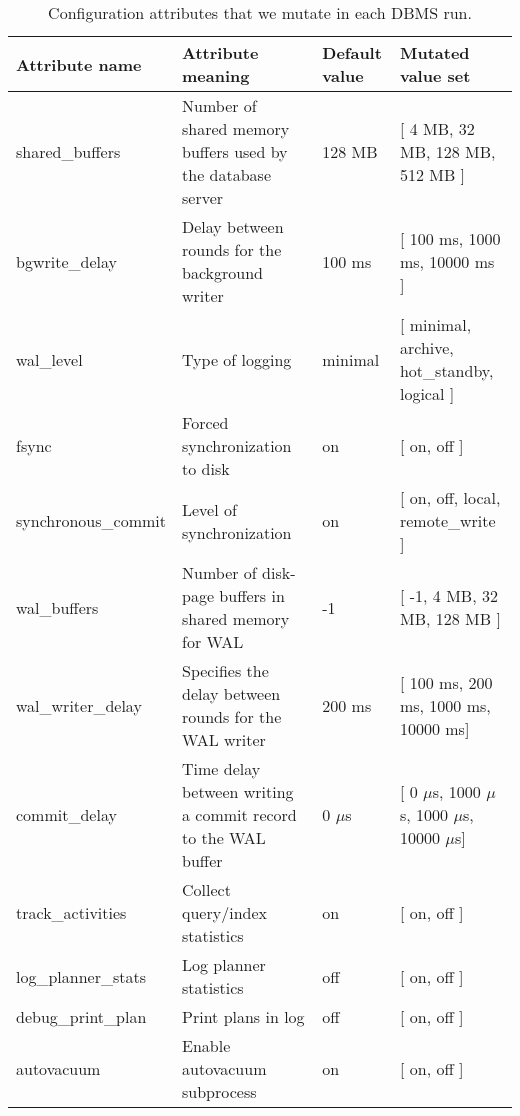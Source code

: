 \begin{table*}
\centering
\small{
  \centering
  \begin{adjustbox}{max width=\textwidth}
  \begin{tabular}{l|lll} 
	\toprule
   		Attribute name &  Attribute meaning & Default value & Mutated value set \\
    \midrule
    	shared\_buffers & Number of shared memory buffers used by the
    	database server & 128 MB &  [ 4 MB, 32 MB, 128 MB, 512 MB ] \\
    	bgwrite\_delay &  Delay between rounds for the
    	background writer & 100 ms &  [ 100 ms, 1000 ms, 10000 ms ] \\
    	wal\_level & Type of logging & minimal &  [ minimal, archive,
    	hot\_standby, logical ] \\
    	fsync & Forced synchronization to disk & on &  [ on, off ] \\
    	synchronous\_commit & Level of synchronization & on &  [ on, off, local,
    	remote\_write ] \\
    	wal\_buffers & Number of disk-page buffers in shared memory for WAL & 
    	-1 &  [ -1, 4 MB, 32 MB, 128 MB ] \\
    	wal\_writer\_delay & Specifies the delay between rounds for the
    	WAL writer & 200 ms &  [ 100 ms, 200 ms, 1000 ms, 10000 ms] \\
    	commit\_delay & Time delay between writing a commit record to the WAL
    	buffer & 0 $\mu$s &  [ 0 $\mu$s, 1000 $\mu$s, 1000 $\mu$s, 10000 $\mu$s] \\
    	track\_activities & Collect query/index statistics  & on &  [ on, off ]	\\
    	log\_planner\_stats & Log planner statistics  & off &  [ on, off ] \\
    	debug\_print\_plan & Print plans in log  & off &  [ on, off ] \\
    	autovacuum & Enable autovacuum subprocess  & on &  [ on, off ] \\    	    	
   \bottomrule
   \end{tabular}
   \end{adjustbox}   
 }
\caption{Configuration attributes that we mutate in each DBMS run.}
\label{tab:mutate}
\end{table*}

